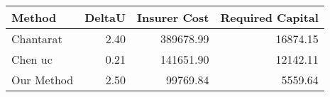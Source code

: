 \begin{tabular}{lrrr}
\toprule
Method & DeltaU & Insurer Cost & Required Capital \\
\midrule
Chantarat & 2.40 & 389678.99 & 16874.15 \\
Chen uc & 0.21 & 141651.90 & 12142.11 \\
Our Method & 2.50 & 99769.84 & 5559.64 \\
\bottomrule
\end{tabular}
